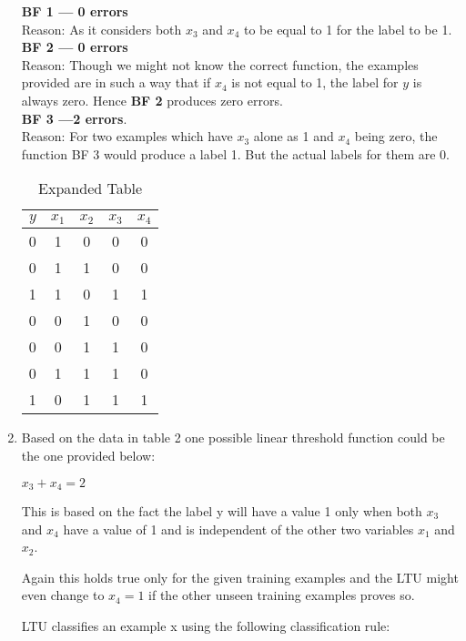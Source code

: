 \documentclass[12pt, fullpage,letterpaper]{article}
\begin{document}
\begin{enumerate}
 \textbf{BF 1 --- 0 errors} \\
  Reason: As it considers both $x_3$ and $x_4$ to be equal to 1 for the label to be 1.\\

 \textbf{BF 2 --- 0 errors} \\
 Reason: Though we might not know the correct function, the examples provided are in such a way that if $x_4$ is not equal to 1, the label for $y$ is always zero. Hence \textbf{BF 2} produces zero errors.\\

\textbf{BF 3 ---2 errors}.\\
Reason:  For two examples which have $x_3$ alone as 1 and $x_4$ being zero, the function BF 3 would produce a label 1. But the actual labels for them are 0.

\begin{table}[h]
	\centering
	\begin{tabular}{|c|cccc|}
		\hline
		$y$  & $x_1$ & $x_2$  & $x_3$  & $x_4$  \\
		\hline
		0  &  1    &  0     &  0     &  0     \\
		0  &  1    &  1     &  0     &  0     \\
		1  &  1    &  0     &  1     &  1     \\
		0  &  0    &  1     &  0     &  0     \\
		0  &  0    &  1     &  1     &  0     \\
		0  &  1    &  1     &  1     &  0     \\
		1  &  0    &  1     &  1     &  1     \\
		\hline
	\end{tabular}
	\caption{Expanded Table}
	\label{t2}
\end{table}


\item Based on the data in table 2 one possible linear threshold function could be the one provided below:

$x_3 +x_4=2$

This is based on the fact the label y will have a value 1 only when both $x_3$ and $x_4$ have a value of 1 and is independent of the other two variables $x_1$ and $x_2$. 

Again this holds true only for the given training examples and the LTU might even change to $x_4=1$ if the other unseen training examples proves so. 

LTU classifies an example x  using the following classification rule:


\end{enumerate}
\end{document}
